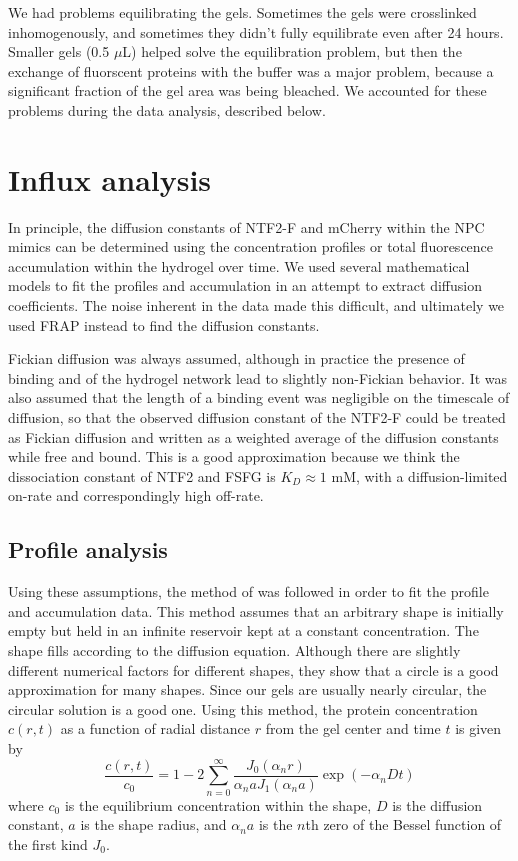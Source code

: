 We had problems equilibrating the gels.  Sometimes the gels were crosslinked inhomogenously, and sometimes they didn't fully equilibrate even after 24 hours.  Smaller gels (0.5 $\mu$L) helped solve the equilibration problem, but then the exchange of fluorscent proteins with the buffer was a major problem, because a significant fraction of the gel area was being bleached.  We accounted for these problems during the data analysis, described below.

\section{Influx analysis}
In principle, the diffusion constants of NTF2-F and mCherry within the NPC mimics can be determined using the concentration profiles or total fluorescence accumulation within the hydrogel over time.  We used several mathematical models to fit the profiles and accumulation in an attempt to extract diffusion coefficients.  The noise inherent in the data made this difficult, and ultimately we used FRAP instead to find the diffusion constants.

Fickian diffusion was always assumed, although in practice the presence of binding and of the hydrogel network lead to slightly non-Fickian behavior.  It was also assumed that the length of a binding event was negligible on the timescale of diffusion, so that the observed diffusion constant of the NTF2-F could be treated as Fickian diffusion and written as a weighted average of the diffusion constants while free and bound.  This is a good approximation because we think the dissociation constant of NTF2 and FSFG is $K_D \approx 1$ mM, with a diffusion-limited on-rate and correspondingly high off-rate.
\subsection{Profile analysis}
Using these assumptions, the method of \cite{mortensen06} was followed in order to fit the profile and accumulation data.  This method assumes that an arbitrary shape is initially empty but held in an infinite reservoir kept at a constant concentration.  The shape fills according to the diffusion equation.  Although there are slightly different numerical factors for different shapes, they show that a circle is a good approximation for many shapes.  Since our gels are usually nearly circular, the circular solution is a good one.  Using this method, the protein concentration $c(r,t)$ as a function of radial distance $r$ from the gel center and time $t$ is given by
\begin{equation}
\frac{c(r,t)}{c_0} = 1 - 2\sum_{n=0}^\infty \frac{J_0(\alpha_n r)}{\alpha_n a J_1(\alpha_n a)}\exp(-\alpha_n D t)
\label{eq:full-profile}
\end{equation}
where $c_0$ is the equilibrium concentration within the shape, $D$ is the diffusion constant, $a$ is the shape radius, and $\alpha_n a$ is the $n$th zero of the Bessel function of the first kind $J_0$.

